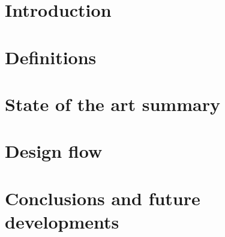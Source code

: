 \documentclass[11pt, a4paper, twoside, openright]{report}
\begin{document}
\setlength{\parskip}{0.5em}
\tableofcontents

\setlength{\parskip}{1em}
\chapter{Introduction}


\chapter{Definitions}


\chapter{State of the art summary}


\chapter{Design flow}


\chapter{Conclusions and future developments}


\setlength{\parskip}{0.3em}
\listoffigures


\printbibliography[heading=bibintoc]
\end{document}
